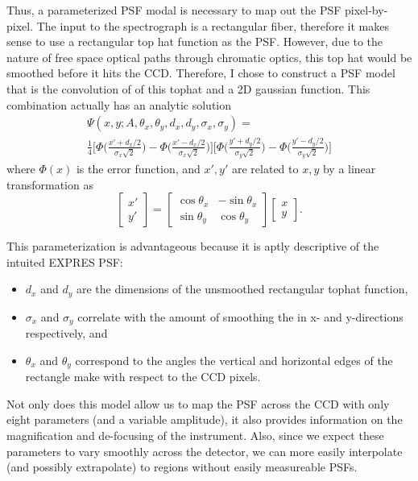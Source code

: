 \documentclass[11pt]{article}
\begin{document}
Thus, a parameterized PSF modal is necessary to map out the PSF pixel-by-pixel. The input to the spectrograph is a rectangular fiber, therefore it makes sense to use a rectangular top hat function as the PSF. However, due to the nature of free space optical paths through chromatic optics, this top hat would be smoothed before it hits the CCD. Therefore, I chose to construct a PSF model that is the convolution of of this tophat and a 2D gaussian function. This combination actually has an analytic solution
\begin{multline}
    \Psi(x, y; A, \theta_x, \theta_y, d_x, d_y, \sigma_x, \sigma_y) = \\
    \frac{1}{4} \Bigg[\Phi\bigg(\frac{x' + d_x/2}{\sigma_x \sqrt{2}}\bigg) - \Phi\bigg(\frac{x' - d_x/2}{\sigma_x \sqrt{2}}\bigg)\Bigg] \Bigg[\Phi\bigg(\frac{y' + d_y/2}{\sigma_y \sqrt{2}}\bigg) - \Phi\bigg(\frac{y' - d_y/2}{\sigma_y \sqrt{2}}\bigg)\Bigg]
    \label{eq:expres_psf}
\end{multline}
where $\Phi(x)$ is the error function, and $x',y'$ are related to $x,y$ by a linear transformation as
\begin{equation}
    \begin{bmatrix}x' \\ y' \end{bmatrix} = 
    \begin{bmatrix}\cos \theta_x & -\sin\theta_x \\ \sin \theta_y & \cos\theta_y\end{bmatrix}\begin{bmatrix}x \\ y\end{bmatrix}.
\end{equation}

This parameterization is advantageous because it is aptly descriptive of the intuited EXPRES PSF:
\begin{itemize}
    \item $d_x$ and $d_y$ are the dimensions of the unsmoothed rectangular tophat function,
    \item $\sigma_x$ and $\sigma_y$ correlate with the amount of smoothing the in x- and y-directions respectively, and
    \item $\theta_x$ and $\theta_y$ correspond to the angles the vertical and horizontal edges of the rectangle make with respect to the CCD pixels.
\end{itemize}
Not only does this model allow us to map the PSF across the CCD with only eight parameters (and a variable amplitude), it also provides information on the magnification and de-focusing of the instrument. Also, since we expect these parameters to vary smoothly across the detector, we can more easily interpolate (and possibly extrapolate) to regions without easily measureable PSFs.
\end{document}
